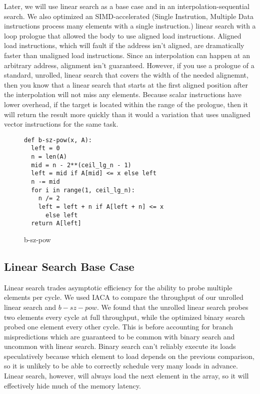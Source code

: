 \documentclass[twocolumn]{article}
\begin{document}
Later, we will use linear search as a base case and in an interpolation-sequential search. We also optimized an SIMD-accelerated (Single Instrution, Multiple Data instructions process many elements with a single instruction.) linear search with a loop prologue that allowed the body to use aligned load instructions. Aligned load instructions, which will fault if the address isn't aligned, are dramatically faster than unaligned load instructions. Since an interpolation can happen at an arbitrary address, alignment isn't guaranteed. However, if you use a prologue of a standard, unrolled, linear search that covers the width of the needed alignemnt, then you know that a linear search that starts at the first aligned position after the interpolation will not miss any elements. Because scalar instructions have lower overhead, if the target is located within the range of the prologue, then it will return the result more quickly than it would a variation that uses unaligned vector instructions for the same task.

\begin{figure}[ht]
\begin{verbatim}
def b-sz-pow(x, A):
  left = 0
  n = len(A)
  mid = n - 2**(ceil_lg_n - 1)
  left = mid if A[mid] <= x else left
  n -= mid
  for i in range(1, ceil_lg_n):
    n /= 2
    left = left + n if A[left + n] <= x
      else left
  return A[left]
\end{verbatim}
\caption{b-sz-pow}
  \label{b-sz-pow}
\end{figure}

\subsection{Linear Search Base Case}
\label{linear}
Linear search trades asymptotic efficiency for the ability to probe multiple elements per cycle. We used IACA to compare the throughput of our unrolled linear search and $b-sz-pow$. We found that the unrolled linear search probes two elements every cycle at full throughput, while the optimized binary search probed one element every other cycle. This is before accounting for branch mispredictions which are guaranteed to be common with binary search and uncommon with linear search. Binary search can't reliably execute its loads speculatively because which element to load depends on the previous comparison, so it is unlikely to be able to correctly schedule very many loads in advance. Linear search, however, will always load the next element in the array, so it will effectively hide much of the memory latency.
\end{document}
